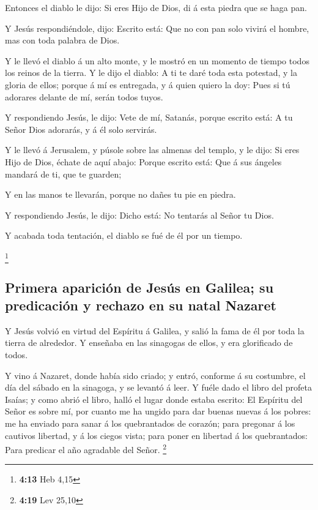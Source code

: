  Entonces el diablo le dijo: Si eres Hijo de Dios, di á
esta piedra que se haga pan.

 Y Jesús respondiéndole, dijo: Escrito está: Que no con
pan solo vivirá el hombre, mas con toda palabra de Dios.

 Y le llevó el diablo á un alto monte, y le mostró en un
momento de tiempo todos los reinos de la tierra.  Y le
dijo el diablo: A ti te daré toda esta potestad, y la gloria de ellos;
porque á mí es entregada, y á quien quiero la doy:  Pues
si tú adorares delante de mí, serán todos tuyos.

 Y respondiendo Jesús, le dijo: Vete de mí, Satanás,
porque escrito está: A tu Señor Dios adorarás, y á él solo servirás.

 Y le llevó á Jerusalem, y púsole sobre las almenas del
templo, y le dijo: Si eres Hijo de Dios, échate de aquí abajo:
 Porque escrito está: Que á sus ángeles mandará de ti,
que te guarden;

 Y en las manos te llevarán, porque no dañes tu pie en
piedra.

 Y respondiendo Jesús, le dijo: Dicho está: No tentarás
al Señor tu Dios.

 Y acabada toda tentación, el diablo se fué de él por un
tiempo.

\footnote{\textbf{4:13} Heb 4,15}

\hypertarget{primera-apariciuxf3n-de-jesuxfas-en-galilea-su-predicaciuxf3n-y-rechazo-en-su-natal-nazaret}{%
\subsection{Primera aparición de Jesús en Galilea; su predicación y
rechazo en su natal
Nazaret}\label{primera-apariciuxf3n-de-jesuxfas-en-galilea-su-predicaciuxf3n-y-rechazo-en-su-natal-nazaret}}

 Y Jesús volvió en virtud del Espíritu á Galilea, y salió
la fama de él por toda la tierra de alrededor.  Y
enseñaba en las sinagogas de ellos, y era glorificado de todos.

 Y vino á Nazaret, donde había sido criado; y entró,
conforme á su costumbre, el día del sábado en la sinagoga, y se levantó
á leer.  Y fuéle dado el libro del profeta Isaías; y como
abrió el libro, halló el lugar donde estaba escrito:  El
Espíritu del Señor es sobre mí, por cuanto me ha ungido para dar buenas
nuevas á los pobres: me ha enviado para sanar á los quebrantados de
corazón; para pregonar á los cautivos libertad, y á los ciegos vista;
para poner en libertad á los quebrantados:  Para predicar
el año agradable del Señor. \footnote{\textbf{4:19} Lev 25,10}

